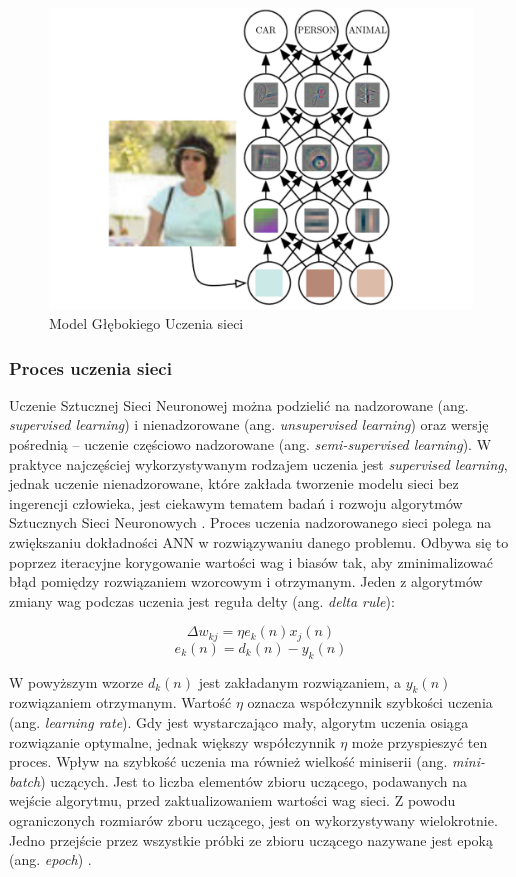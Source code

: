 \begin{figure}[!h]
  \centering
  \includegraphics[width=\textwidth]{img/dnn-object-recog.png}
  \caption{Model Głębokiego Uczenia sieci}
  \label{dnn}
\end{figure}


\subsubsection{Proces uczenia sieci}

Uczenie Sztucznej Sieci Neuronowej można podzielić na nadzorowane (ang. \emph{supervised learning}) i nienadzorowane (ang. \emph{unsupervised learning}) oraz wersję pośrednią -- uczenie częściowo nadzorowane (ang. \emph{semi-supervised learning}). W praktyce najczęściej wykorzystywanym rodzajem uczenia jest \emph{supervised learning}, jednak uczenie nienadzorowane, które zakłada tworzenie modelu sieci bez ingerencji człowieka, jest ciekawym tematem badań i rozwoju algorytmów Sztucznych Sieci Neuronowych \cite{nielsen2015neural}.
Proces uczenia nadzorowanego sieci polega na zwiększaniu dokładności ANN w rozwiązywaniu danego problemu. Odbywa się to poprzez iteracyjne korygowanie wartości wag i biasów tak, aby zminimalizować błąd pomiędzy rozwiązaniem wzorcowym i otrzymanym. Jeden z algorytmów zmiany wag podczas uczenia jest reguła delty (ang. \emph{delta rule}):


$$\Delta w_{kj} = \eta e_k(n)x_j(n) $$
$$ e_k(n) = d_k(n) - y_k(n) $$

W powyższym wzorze $d_k(n)$ jest zakładanym rozwiązaniem, a $y_k(n)$ rozwiązaniem otrzymanym.
Wartość $\eta$ oznacza współczynnik szybkości uczenia (ang. \emph{learning rate}). Gdy jest wystarczająco mały, algorytm uczenia osiąga rozwiązanie optymalne, jednak większy współczynnik $\eta$ może przyspieszyć ten proces. Wpływ na szybkość uczenia ma również wielkość miniserii (ang. \emph{mini-batch}) uczących. Jest to liczba elementów zbioru uczącego, podawanych na wejście algorytmu, przed zaktualizowaniem wartości wag sieci. Z powodu ograniczonych rozmiarów zboru uczącego, jest on wykorzystywany wielokrotnie. Jedno przejście przez wszystkie próbki ze zbioru uczącego nazywane jest epoką (ang. \emph{epoch}) \cite{tadeusiewicz2015leksykon}.

